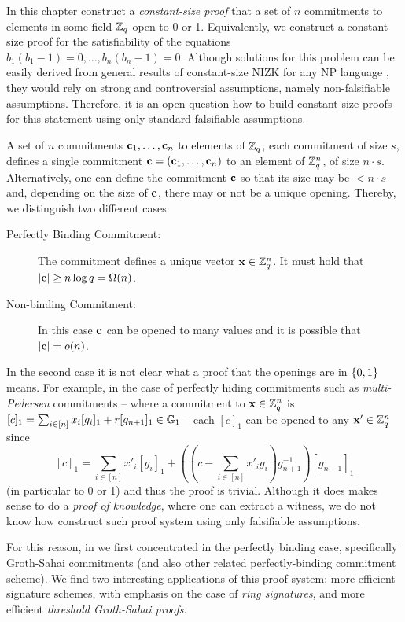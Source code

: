 In this chapter construct a \emph{constant-size proof} that a set of $n$ commitments to elements in some field $\mathbb{Z}_q$ open to 0 or 1. Equivalently, we construct a constant size proof for the satisfiability of the equations $b_1(b_1-1)=0,\ldots,b_n(b_n-1)=0$.
Although solutions for this problem can be easily derived from general results of constant-size NIZK for any NP language \cite{EC:GGPR13,AC:DFGK14,EC:Groth16}, they would rely on strong and controversial assumptions, namely non-falsifiable assumptions. Therefore, it is an open question how to build constant-size proofs for this statement using only standard falsifiable assumptions. 

A set of $n$ commitments $\mathbf{c}_1,\ldots,\mathbf{c}_n$ to elements of $\mathbb{Z}_q$, each commitment of size $s$, defines a single commitment $\mathbf{c}=(\mathbf{c}_1,\ldots,\mathbf{c}_n)$ to an element of $\mathbb{Z}_q^n$, of size $n\cdot s$. Alternatively, one can define the commitment $\mathbf{c}$ so that its size may be $<n\cdot s$ and, depending on the size of $\mathbf{c}$, there may or not be a unique opening. Thereby, we distinguish two different cases:

\begin{description}
\item[Perfectly Binding Commitment:] The commitment defines a unique vector $\mathbf{x}\in\mathbb{Z}_q^n$. It must hold that $|\mathbf{c}|\geq n\log q = \Omega(n)$.
\item[Non-binding Commitment:] In this case $\mathbf{c}$ can be opened to many values and it is possible that $|\mathbf{c}|= o(n)$.
\end{description}

In the second case it is not clear what a proof that the openings are in $\{0,1\}$ means. For example, in the case of perfectly hiding commitments such as \emph{multi-Pedersen} commitments -- where a commitment to $\mathbf{x}\in\mathbb{Z}_q^n$ is $[c]_1=\sum_{i\in[n]}x_i[g_i]_1+r[g_{n+1}]_1\in\mathbb{G}_1$ -- each $[c]_1$ can be opened to any $\mathbf{x}'\in\mathbb{Z}_q^n$ since
$$[c]_1=\sum_{i\in[n]}x'_i[g_i]_1+\left(\left(c-\sum_{i\in[n]}x'_ig_i\right)g_{n+1}^{-1}\right)[g_{n+1}]_1$$
(in particular to 0 or 1) and thus the proof is trivial. Although it does makes sense to do a \emph{proof of knowledge}, where one can extract a witness, we do not know how construct such proof system using only falsifiable assumptions.

For this reason, in \cite{AC:GonHevRaf15} we first concentrated in the perfectly binding case, specifically Groth-Sahai commitments (and also other related perfectly-binding commitment scheme). We find two interesting applications of this proof system: more efficient signature schemes, with emphasis on the case of \emph{ring signatures}, and more efficient \emph{threshold Groth-Sahai proofs}.
 

